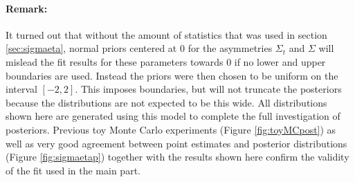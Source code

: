 \paragraph{Remark:}
It turned out that without the amount of statistics that was used in section \ref{sec:sigmaeta}, normal priors centered at $0$ for the asymmetries $\Sigma_t$ and $\Sigma$ will mislead the fit results for these parameters towards $0$ if no lower and upper boundaries are used. Instead the priors were then chosen to be uniform on the interval $[-2,2]$. This imposes boundaries, but will not truncate the posteriors because the distributions are not expected to be this wide. All distributions shown here are generated using this model to complete the full investigation of posteriors. Previous toy Monte Carlo experiments (Figure \ref{fig:toyMCpost}) as well as very good agreement between point estimates and posterior distributions (Figure \ref{fig:sigmaetap}) together with the results shown here confirm the validity of the fit used in the main part.